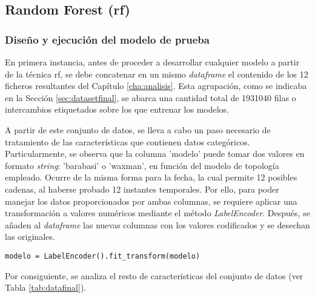 \subsection{Random Forest (\acrshort{rf})}
\label{sec:rf}

\subsubsection{Diseño y ejecución del modelo de prueba}
\label{sec:rf1}

En primera instancia, antes de proceder a desarrollar cualquier modelo a partir de la técnica \gls{rf}, se debe concatenar en un mismo \textit{dataframe} el contenido de los 12 ficheros resultantes del Capítulo \ref{cha:analisis}. Esta agrupación, como se indicaba en la Sección \ref{sec:datasetfinal}, se abarca una cantidad total de 1931040 filas o intercambios etiquetados sobre los que entrenar los modelos. 

\vspace{3mm}

A partir de este conjunto de datos, se lleva a cabo un paso necesario de tratamiento de las características que contienen datos categóricos. Particularmente, se observa que la columna 'modelo' puede tomar dos valores en formato \textit{string}: 'barabasi' o 'waxman', en función del modelo de topología empleado. Ocurre de la misma forma para la fecha, la cual permite 12 posibles cadenas, al haberse probado 12 instantes temporales. Por ello, para poder manejar los datos proporcionados por ambas columnas, se requiere aplicar una transformación a valores numéricos mediante el método \textit{LabelEncoder}. Después, se añaden al \textit{dataframe} las nuevas columnas con los valores codificados y se desechan las originales.

\vspace{3mm}

\begin{lstlisting}[style=Python, caption={Codificación de la columna 'modelo'}]
modelo = LabelEncoder().fit_transform(modelo) 
\end{lstlisting}

\vspace{3mm}

Por consiguiente, se analiza el resto de características del conjunto de datos (ver Tabla \ref{tab:datafinal}).



